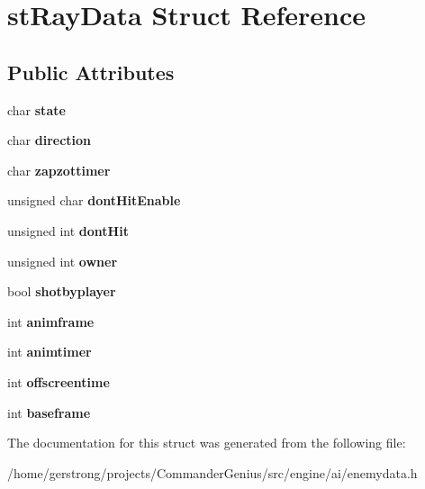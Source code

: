 \hypertarget{structst_ray_data}{
\section{stRayData Struct Reference}
\label{structst_ray_data}
}
\subsection*{Public Attributes}
\begin{DoxyCompactItemize}
\item 
\hypertarget{structst_ray_data_a0d434e39e7c0151d36447d66759b6aa8}{
char {\bfseries state}}
\label{structst_ray_data_a0d434e39e7c0151d36447d66759b6aa8}

\item 
\hypertarget{structst_ray_data_a3c297ada05ef5d2b1a998b3dc7df00e7}{
char {\bfseries direction}}
\label{structst_ray_data_a3c297ada05ef5d2b1a998b3dc7df00e7}

\item 
\hypertarget{structst_ray_data_a1bd7c086437ade31bf814f182e1aae81}{
char {\bfseries zapzottimer}}
\label{structst_ray_data_a1bd7c086437ade31bf814f182e1aae81}

\item 
\hypertarget{structst_ray_data_a057168cdae1663f55a04e7adfb1e98f6}{
unsigned char {\bfseries dontHitEnable}}
\label{structst_ray_data_a057168cdae1663f55a04e7adfb1e98f6}

\item 
\hypertarget{structst_ray_data_a914eb40e795005f1dcd564719c2be532}{
unsigned int {\bfseries dontHit}}
\label{structst_ray_data_a914eb40e795005f1dcd564719c2be532}

\item 
\hypertarget{structst_ray_data_a0530c4552ec58bb95072c3193ab90e9c}{
unsigned int {\bfseries owner}}
\label{structst_ray_data_a0530c4552ec58bb95072c3193ab90e9c}

\item 
\hypertarget{structst_ray_data_a670ae99c3399e36afcaa0f9bb7dd90a0}{
bool {\bfseries shotbyplayer}}
\label{structst_ray_data_a670ae99c3399e36afcaa0f9bb7dd90a0}

\item 
\hypertarget{structst_ray_data_adeaca44ea2f7a5d756ce0c9c84bc28d2}{
int {\bfseries animframe}}
\label{structst_ray_data_adeaca44ea2f7a5d756ce0c9c84bc28d2}

\item 
\hypertarget{structst_ray_data_adc86d686d65167064e894c1f78d59707}{
int {\bfseries animtimer}}
\label{structst_ray_data_adc86d686d65167064e894c1f78d59707}

\item 
\hypertarget{structst_ray_data_a6b66622838e9126e0c91e05cf96e513c}{
int {\bfseries offscreentime}}
\label{structst_ray_data_a6b66622838e9126e0c91e05cf96e513c}

\item 
\hypertarget{structst_ray_data_a8a6d74c68ea2f5d957dc1e2d2b290656}{
int {\bfseries baseframe}}
\label{structst_ray_data_a8a6d74c68ea2f5d957dc1e2d2b290656}

\end{DoxyCompactItemize}


The documentation for this struct was generated from the following file:\begin{DoxyCompactItemize}
\item 
/home/gerstrong/projects/CommanderGenius/src/engine/ai/enemydata.h\end{DoxyCompactItemize}
